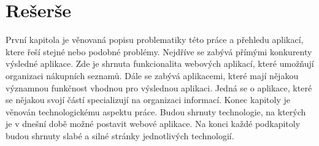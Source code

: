 
%

\chapter{Rešerše}
První kapitola je věnovaná popisu problematiky této práce a přehledu aplikací, ktere řeší stejné nebo podobné problémy.
Nejdříve se zabývá přímými konkurenty výsledné aplikace. Zde je shrnuta funkcionalita webových aplikací, které umožňují organizaci nákupních seznamů.
Dále se zabývá aplikacemi, které mají nějakou významnou funkčnost vhodnou pro výslednou aplikaci. Jedná se o aplikace, které se nějakou svojí částí specializují na organizaci informací. Konec kapitoly je věnován technologickému aspektu práce. Budou shrnuty technologie, na kterých je v dnešní době možné postavit webové aplikace.
Na konci každé podkapitoly budou shrnuty slabé a silné stránky jednotlivých technologií.

